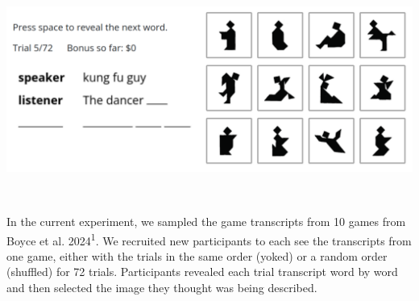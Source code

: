 \documentclass[11pt,a4paper]{article}
\begin{document}
\begin{center}\textbf{}\end{center}
%	
%	
%	
%		


\begin{minipage}{.55\textwidth}
	{	\includegraphics[width=\textwidth]{matcher_diagram.png}} 
	\end{minipage}
~~~
\begin{minipage}{.4\textwidth}

\begin{small}
	In the current experiment, we sampled the game transcripts from 10 games from Boyce et al. 2024\textsuperscript{1}. We recruited new participants to each see the transcripts from one game, either with the trials in the same order (yoked) or a random order (shuffled) for 72 trials.  Participants revealed each trial transcript word by word and then selected the image they thought was being described. 
	
\end{small}	
\end{minipage}
\end{document}
